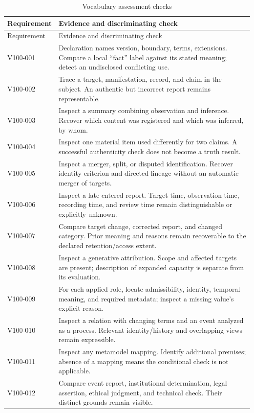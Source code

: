 \documentclass[11pt,a4paper]{article}
\begin{document}
\begin{longtable}{@{}L{0.17\textwidth}L{0.73\textwidth}@{}}
\caption{Vocabulary assessment checks}\label{tab:gr100-a}\\
\toprule
Requirement & Evidence and discriminating check \\
\midrule\endfirsthead
\toprule
Requirement & Evidence and discriminating check \\
\midrule\endhead
V100-001 & Declaration names version, boundary, terms, extensions. Compare a local ``fact'' label against its stated meaning; detect an undisclosed conflicting use. \\
V100-002 & Trace a target, manifestation, record, and claim in the subject. An authentic but incorrect report remains representable. \\
V100-003 & Inspect a summary combining observation and inference. Recover which content was registered and which was inferred, by whom. \\
V100-004 & Inspect one material item used differently for two claims. A successful authenticity check does not become a truth result. \\
V100-005 & Inspect a merger, split, or disputed identification. Recover identity criterion and directed lineage without an automatic merger of targets. \\
V100-006 & Inspect a late-entered report. Target time, observation time, recording time, and review time remain distinguishable or explicitly unknown. \\
V100-007 & Compare target change, corrected report, and changed category. Prior meaning and reasons remain recoverable to the declared retention/access extent. \\
V100-008 & Inspect a generative attribution. Scope and affected targets are present; description of expanded capacity is separate from its evaluation. \\
V100-009 & For each applied role, locate admissibility, identity, temporal meaning, and required metadata; inspect a missing value's explicit reason. \\
V100-010 & Inspect a relation with changing terms and an event analyzed as a process. Relevant identity/history and overlapping views remain expressible. \\
V100-011 & Inspect any metamodel mapping. Identify additional premises; absence of a mapping means the conditional check is not applicable. \\
V100-012 & Compare event report, institutional determination, legal assertion, ethical judgment, and technical check. Their distinct grounds remain visible. \\

\end{longtable}
\end{document}
